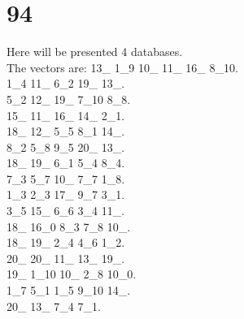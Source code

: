 \chapter{94}
\indent Here will be presented 4 databases.\\
The vectors are:
13\_ 1\_9 10\_ 11\_ 16\_ 8\_10.\\1\_4 11\_ 6\_2 19\_ 13\_.\\5\_2 12\_ 19\_ 7\_10 8\_8.\\15\_ 11\_ 16\_ 14\_ 2\_1.\\18\_ 12\_ 5\_5 8\_1 14\_.\\8\_2 5\_8 9\_5 20\_ 13\_.\\18\_ 19\_ 6\_1 5\_4 8\_4.\\7\_3 5\_7 10\_ 7\_7 1\_8.\\1\_3 2\_3 17\_ 9\_7 3\_1.\\3\_5 15\_ 6\_6 3\_4 11\_.\\18\_ 16\_0 8\_3 7\_8 10\_.\\18\_ 19\_ 2\_4 4\_6 1\_2.\\20\_ 20\_ 11\_ 13\_ 19\_.\\19\_ 1\_10 10\_ 2\_8 10\_0.\\1\_7 5\_1 1\_5 9\_10 14\_.\\20\_ 13\_ 7\_4 7\_1.\\